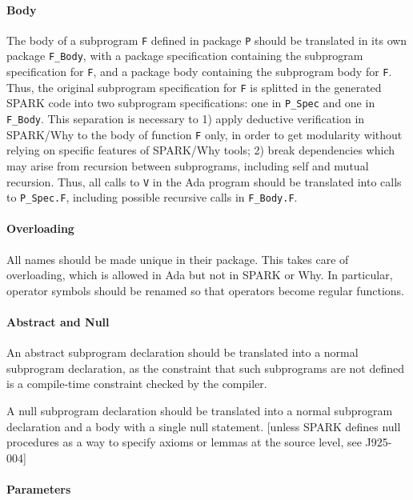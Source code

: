 \documentclass{article}
\begin{document}
\paragraph{Body}

The body of a subprogram \verb|F| defined in package \verb|P| should be
translated in its own package \verb|F_Body|, with a package specification
containing the subprogram specification for \verb|F|, and a package body
containing the subprogram body for \verb|F|. Thus, the original subprogram
specification for \verb|F| is splitted in the generated SPARK code into two
subprogram specifications: one in \verb|P_Spec| and one in \verb|F_Body|. This
separation is necessary to 1) apply deductive verification in SPARK/Why to the
body of function \verb|F| only, in order to get modularity without relying on
specific features of SPARK/Why tools; 2) break dependencies which may arise
from recursion between subprograms, including self and mutual recursion.  Thus,
all calls to \verb|V| in the Ada program should be translated into calls to
\verb|P_Spec.F|, including possible recursive calls in \verb|F_Body.F|.

\paragraph{Overloading}

All names should be made unique in their package. This takes care of
overloading, which is allowed in Ada but not in SPARK or Why. In particular,
operator symbols should be renamed so that operators become regular functions.

\paragraph{Abstract and Null}

An abstract subprogram declaration should be translated into a normal
subprogram declaration, as the constraint that such subprograms are not defined
is a compile-time constraint checked by the compiler.

A null subprogram declaration should be translated into a normal subprogram
declaration and a body with a single null statement. [unless SPARK defines null
procedures as a way to specify axioms or lemmas at the source level, see
J925-004]

\paragraph{Parameters} 
\end{document}
